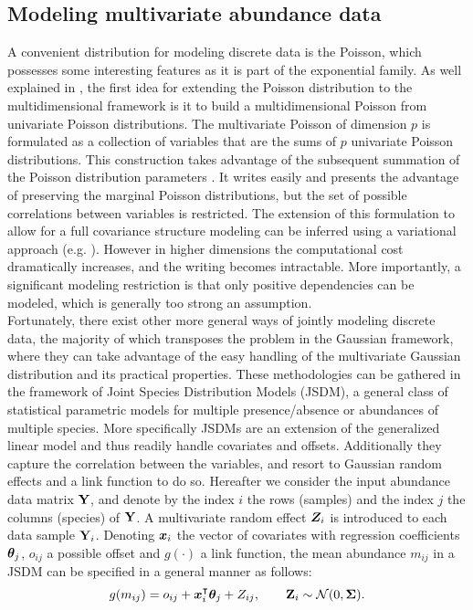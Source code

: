   \subsection{Modeling multivariate abundance data}
  A convenient distribution for modeling discrete data is the Poisson, which possesses some interesting features as it is part of the exponential family. As well explained in \citet{inouye}, the first idea for extending the Poisson distribution to the multidimensional framework is it to build a multidimensional Poisson from univariate Poisson distributions. The multivariate Poisson of dimension $p$ is formulated as a collection of variables that are the sums of $p$ univariate Poisson distributions. This construction  takes advantage of the subsequent summation of the Poisson distribution parameters \citep{T54}. It writes easily and presents the advantage of preserving the marginal Poisson distributions, but the set of possible correlations between variables is restricted. The extension of this formulation to allow  for a full covariance structure modeling can be inferred using a variational approach (e.g. \citet{K03}). However in higher dimensions the computational cost dramatically increases, and the writing becomes intractable. More importantly, a significant modeling restriction is that only positive dependencies can be modeled, which is generally too strong an assumption. \\

Fortunately, there exist other more general ways of jointly modeling discrete data,  the majority of which transposes the problem in the Gaussian framework, where they can take advantage of the easy handling of the multivariate Gaussian distribution and its practical properties. These methodologies can be gathered in the framework of Joint Species Distribution Models (JSDM), a general class of statistical parametric models for multiple presence/absence or abundances of multiple species. More specifically JSDMs are an extension of the generalized linear model and thus readily handle covariates and offsets. Additionally they capture the correlation between the variables, and resort to Gaussian random effects and a link function to do so. Hereafter we consider the input abundance data matrix ${\bf Y}$, and denote by the index $i$ the rows (samples) and the index $j$ the columns (species) of ${\bf Y}$. A multivariate random effect ${\boldsymbol{Z}}_i$ is introduced to each data sample ${\bf Y}_i$.  Denoting ${\boldsymbol{x}}_i$ the vector of covariates with regression coefficients ${\boldsymbol{\theta}}_j$, $o_{ij}$ a possible offset  and $g(\cdot)$ a link function, the mean abundance $m_{ij}$  in a JSDM can be specified in a general manner as follows:
$$g(m_{ij}) = o_{ij}+{\boldsymbol{x}}_i^\intercal  {\boldsymbol{\theta}}_j + Z_{ij}, \qquad {\bf Z}_i \sim \mathcal{N}(0, {\boldsymbol{\Sigma}}).$$

